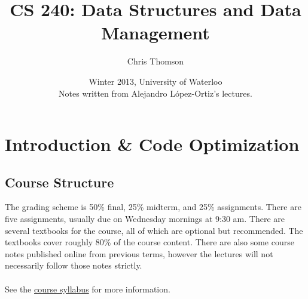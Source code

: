 \documentclass[]{article}
\theoremstyle{definition}
\newcommand{\lecture}[1]{\marginpar{{\footnotesize $\leftarrow$ \underline{#1}}}}
\begin{document}
	\let\ref\Cref

	\title{\bf{CS 240: Data Structures and Data Management}}
	\date{Winter 2013, University of Waterloo \\ \center Notes written from Alejandro L\'opez-Ortiz's lectures.}
	\author{Chris Thomson}
	\maketitle
	\newpage

	\section{Introduction \& Code Optimization} \lecture{January 8, 2013}
		\subsection{Course Structure}
			The grading scheme is 50\% final, 25\% midterm, and 25\% assignments. There are five assignments, usually due on Wednesday mornings at 9:30 am. There are several textbooks for the course, all of which are optional but recommended. The textbooks cover roughly 80\% of the course content. There are also some course notes published online from previous terms, however the lectures will not necessarily follow those notes strictly.
			\\ \\
			See the \href{https://www.student.cs.uwaterloo.ca/~cs240/w13/info.phtml}{course syllabus} for more information.
			
\end{document}
